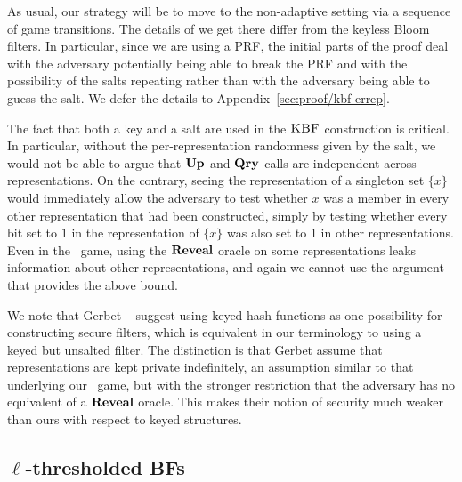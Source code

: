 As usual, our strategy will be to move to the non-adaptive setting via a
sequence of game transitions.  The details of we get there differ from the
keyless Bloom filters.  In particular, since we are using a PRF, the initial
parts of the proof deal with the adversary potentially being able to break the
PRF and with the possibility of the salts repeating rather than with the
adversary being able to guess the salt.
%
We defer the details to Appendix~\ref{sec:proof/kbf-errep}.

%  

The fact that both a key and a salt are used in the $\textnormal{\textsc{KBF}}$ construction is
critical. In particular, without the per-representation randomness given by the
salt, we would not be able to argue that $\textup{\textbf{Up}}\hspace{0.5pt}$ and $\textup{\textbf{Qry}}\hspace{0.5pt}$ calls are
independent across representations. On the contrary, seeing the representation
of a singleton set $\{x\}$ would immediately allow the adversary to test whether
$x$ was a member in every other representation that had been constructed, simply
by testing whether every bit set to $1$ in the representation of $\{x\}$ was also
set to 1 in other representations. Even in the \erreps\ game, using the $\mathbf{Reveal}$
oracle on some representations leaks information about other representations,
and again we cannot use the argument that provides the above bound.

We note that Gerbet \etal~\cite{gerbet2015power} suggest using keyed
hash functions as one possibility for constructing secure filters, which is
equivalent in our terminology to using a keyed but unsalted filter.
%
The distinction is that Gerbet \etal assume that representations are kept
private indefinitely, an assumption similar to that underlying our \erreps\
game, but with the stronger restriction that the adversary has no equivalent of
a $\mathbf{Reveal}$ oracle. This makes their notion of security much weaker than ours with
respect to keyed structures.

\subsection{$\ell$-thresholded BFs}\label{sec:bf-thresh}


